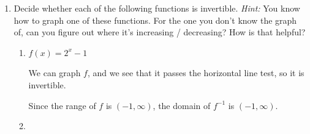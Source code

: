 \documentclass{article}
\begin{document}
\begin{enumerate}
\begin{enumerate}[resume]
\begin{solution}
        (We could also restrict the domain of $g$ to $(-\infty, 0]$. The inverse
        would then be $g^{-1}(x)=-\sqrt{x}$.)
      
    \end{solution}

  \end{enumerate}

\item 


  Decide whether each of the following functions is invertible. \emph{Hint:} You know how to graph one of these functions. For the one you don't know the graph of, can you figure out where it's increasing / decreasing? How is that helpful?

    \begin{enumerate}


    \item


      \begin{problem}
        $f(x) = 2^{x} - 1$
      \end{problem}

      \begin{solution}
        We can graph $f$, and we see that it passes the horizontal line test,
        so it is invertible.
        \begin{center}
        \end{center}
        Since the range of $f$ is $(-1, \infty)$, the domain of $f^{-1}$ is $(-1, \infty)$.
      \end{solution}

    \item


\end{enumerate}
\end{enumerate}
\end{document}
